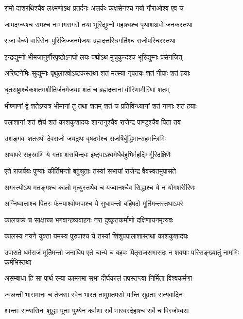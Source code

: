 \twolineshloka
{रामो दाशरथिश्चैव लक्ष्मणोऽथ प्रतर्दनः}
{अलर्कः कक्षसेनश्च गयो गौराओश्व एव च}


\twolineshloka
{जामदग्न्यश्च रामश्च नाभागसगरौ तथा}
{भूरिद्युम्नो महाश्वश्च पृथाशअवो जनकस्तथा}


\twolineshloka
{राजा वैन्यो वारिसेनः पुरिजिज्जनमेजयः}
{ब्रह्मदत्तस्त्रिगर्तिश्च राजोपरिचरस्तथा}


\twolineshloka
{इन्द्रद्युम्नो भीमजानुर्गौरपृष्ठोऽनघो लयः}
{पद्मोऽथ मुचुकुन्दश्च भूरिद्युम्नः प्रसेनजित्}


\twolineshloka
{अरिष्टनेमिः सुद्युम्नः पृथुलाश्वोऽष्टकस्तथा}
{शतं मत्स्या नृपतयः शतं नीपाः शतं हयाः}


\twolineshloka
{धृतराष्ट्राश्चैकशतमशीतिर्जनमेजयाः}
{शतं च ब्रह्मदत्तानां वीरिणामीरिणां शतम्}


\twolineshloka
{भीष्णाणां द्वे शतेऽप्यत्र भीमानां तु तथा शतम्}
{शतं च प्रतिविन्ध्यानां शतं नागाः शतं हयाः}


\twolineshloka
{पलाशानां शतं ज्ञेयं शतं काशकुशादयः}
{शान्तनुश्चैव राजेन्द्र पाण्डुश्चैव पिता तव}


\twolineshloka
{उशङ्गवः शतरथो देवराजो जयद्रथः}
{वृषदर्भश्च राजर्षिर्बुद्धिमान्सहमन्त्रिभिः}


\twolineshloka
{अथापरे सहस्राणि ये गताः शसबिन्दवः}
{इष्ट्वाऽश्वमेधैर्बहुभिर्महद्भिर्भूरिदक्षिणैः}


\twolineshloka
{एते राजर्षयः पुण्याः कीर्तिमन्तो बहुश्रुताः}
{तस्यां सभायां राजेन्द्र वैवस्वतमुपासते}


\twolineshloka
{अगस्त्योऽथ मतङ्गश्च कालो मृत्युस्तथैव च}
{यज्वानश्चैव सिद्धाश्च ये न योगशरीरिणः}


\twolineshloka
{अग्निष्वात्ताश्च पितरः फेनपाश्वोष्मपाश्च ये}
{सुधावन्तो बर्हिषदो मूर्तिमन्तस्तथाऽपरे}


\twolineshloka
{कालचक्रं च साक्षाच्च भगवान्हव्यवाहनः}
{नरा दुष्कृतकर्माणो दक्षिणायनमृत्यवः}


\twolineshloka
{कालस्य नयने युक्ता यमस्य पुरुपाश्च ये}
{तस्यां शिंशुपपालाशास्तथा काशकुशादयः}


\fourlineindentedshloka
{उपासते धर्मराजं मूर्तिमन्तो जनाधिप}
{एते चान्ये च बहवः पितृराजसभासदः}
{न शक्याः परिसङ्ख्यातुं नामभिः कर्मभिस्तथा}
{}


\threelineshloka
{असम्बाधा हि सा पार्थ रम्या कामगमा सभा}
{दीर्घकालं तपस्तप्त्वा निर्मिता विश्वकर्मणा}
{}


\twolineshloka
{ज्वलन्ती भासमाना च तेजसा स्वेन भारत}
{तामुग्रतपसो यान्ति सुव्रताः सत्यवादिनः}


\twolineshloka
{शान्ताः सन्यासिनः शुद्धाः पूताः पुण्येन कर्मणा}
{सर्वे भास्वरदेहाश्च सर्वे च विरजोम्बराः}


